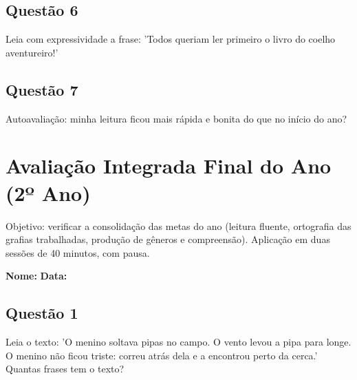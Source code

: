 \begin{center}
  \underline{\hspace{12cm}}
\end{center}

\subsection*{Questão 6}
Leia com expressividade a frase: 'Todos queriam ler primeiro o livro do coelho aventureiro!'

\begin{center}
  \underline{\hspace{12cm}}
\end{center}

\subsection*{Questão 7}
Autoavaliação: minha leitura ficou mais rápida e bonita do que no início do ano?

\begin{center}
  \underline{\hspace{12cm}}
\end{center}

\clearpage

\section{Avaliação Integrada Final do Ano (2º Ano)}

\begin{avaliacao}
Objetivo: verificar a consolidação das metas do ano (leitura fluente, ortografia das grafias trabalhadas, produção de gêneros e compreensão). Aplicação em duas sessões de 40 minutos, com pausa.
\end{avaliacao}

\noindent\textbf{Nome:} \underline{\hspace{4cm}} \quad \textbf{Data:} \underline{\hspace{2cm}}

\subsection*{Questão 1}
Leia o texto: 'O menino soltava pipas no campo. O vento levou a pipa para longe. O menino não ficou triste: correu atrás dela e a encontrou perto da cerca.' Quantas frases tem o texto?

\begin{center}
  \underline{\hspace{12cm}}
\end{center}

